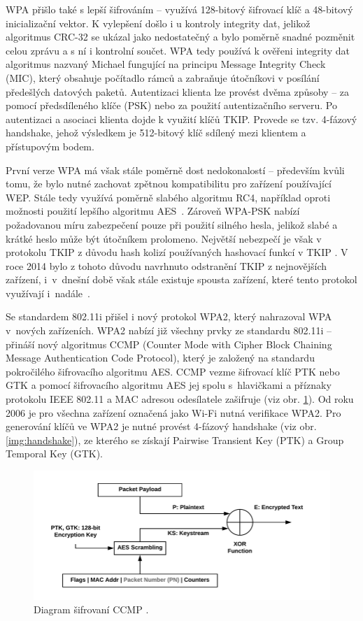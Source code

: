 WPA přišlo také s lepší šifrováním -- využívá 128-bitový šifrovací klíč a 48-bitový inicializační vektor. K vylepšení došlo i u kontroly integrity dat, jelikož algoritmus CRC-32 se ukázal jako nedostatečný a bylo poměrně snadné pozměnit celou zprávu a s ní i kontrolní součet. WPA tedy používá k ověřeni integrity dat algoritmus nazvaný Michael fungující na principu Message Integrity Check (MIC), který obsahuje počítadlo rámců a zabraňuje útočníkovi v posílání předešlých datových paketů. Autentizaci klienta lze provést dvěma způsoby -- za pomocí předsdíleného klíče (PSK) nebo za použití autentizačního serveru. Po autentizaci a asociaci klienta dojde k využití klíčů TKIP. Provede se tzv. 4-fázový handshake, jehož výsledkem je 512-bitový klíč sdílený mezi klientem a přístupovým bodem.

První verze WPA má však stále poměrně dost nedokonalostí -- především kvůli tomu, že bylo nutné zachovat zpětnou kompatibilitu pro zařízení používající WEP. Stále tedy využívá poměrně slabého algoritmu RC4, například oproti možnosti použití lepšího algoritmu AES~\cite{adnan2015comparative}. Zároveň WPA-PSK nabízí požadovanou míru zabezpečení pouze při použití silného hesla, jelikož slabé a krátké heslo může být útočníkem prolomeno. Největší nebezpečí je však v protokolu TKIP z důvodu hash kolizí používaných hashovací funkcí v TKIP \cite{adnan2015comparative}. V roce 2014 bylo z tohoto důvodu navrhnuto odstranění TKIP z nejnovějších zařízení, i~v~dnešní době však stále existuje spousta zařízení, které tento protokol využívají i~nadále~\cite{vanhoef2013practical}.

Se standardem 802.11i \cite{IEEE2005} přišel i nový protokol WPA2, který nahrazoval WPA v~nových zařízeních. WPA2 nabízí již všechny prvky ze standardu 802.11i -- přináší nový algoritmus CCMP (Counter Mode with Cipher Block Chaining Message Authentication Code Protocol), který je založený na standardu pokročilého šifrovacího algoritmu AES. CCMP vezme šifrovací klíč PTK nebo GTK a pomocí šifrovacího algoritmu AES jej spolu s~hlavičkami a příznaky protokolu IEEE 802.11 a MAC adresou odesílatele zašifruje (viz obr. \ref{img:ccmp}). Od roku 2006 je pro všechna zařízení označená jako Wi-Fi nutná verifikace WPA2. Pro generování klíčů ve WPA2 je nutné provést 4-fázový handshake (viz obr. \ref{img:handshake}), ze kterého se získají Pairwise Transient Key (PTK) a Group Temporal Key (GTK).

\begin{figure}[htbp]
  \centering
  \includegraphics[width=15cm]{obrazky-figures/ccmp.png}
  \caption{Diagram šifrovaní CCMP \cite{kohlios2018comprehensive}.}
  \label{img:ccmp}
\end{figure}

